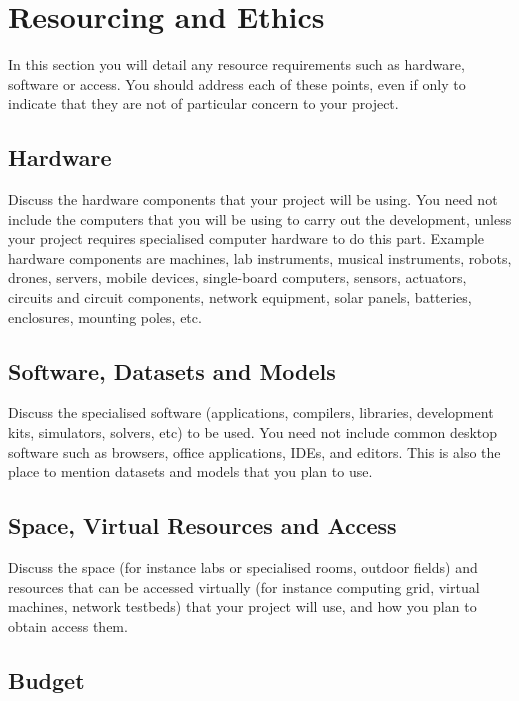 \documentclass[11pt, a4paper, oneside, openright]{article}
\begin{document}
\section{Resourcing and Ethics}

In this section you will detail any resource requirements such as hardware,
software or access. You should address each of these points, even if only to
indicate that they are not of particular concern to your project.

\subsection{Hardware}

Discuss the hardware components that your project will be using. You need not
include the computers that you will be using to carry out the development,
unless your project requires specialised computer hardware to do this part.
Example hardware components are machines, lab instruments, musical instruments,
robots, drones, servers, mobile devices, single-board computers, sensors,
actuators, circuits and circuit components, network equipment, solar panels,
batteries, enclosures, mounting poles, etc.  

\subsection{Software, Datasets and Models}

Discuss the specialised software (applications, compilers, libraries,
development kits, simulators, solvers, etc) to be used. You need not include
common desktop software such as browsers, office applications, IDEs, and
editors. This is also the place to mention datasets and models that you plan to
use. 

\subsection{Space, Virtual Resources and Access}

Discuss the space (for instance labs or specialised rooms, outdoor fields) and
resources that can be accessed virtually (for instance computing grid, virtual
machines, network testbeds) that your project will use, and how you plan to
obtain access them. 

\subsection{Budget}
\end{document}

